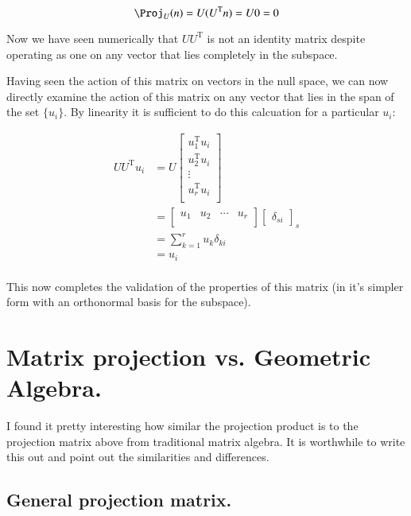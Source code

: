 \documentclass{article}      %
\newcommand{\T}[0]{{\text{T}}}
\begin{document}
\[
\Proj_U(n) = U (U^\T n) = U 0 = 0
\]

Now we have seen numerically that $U U^\T$ is not an identity matrix despite 
operating as one on any vector that lies completely in the subspace.

Having seen the action of this matrix on vectors in the null space, we can now
directly examine the action of this matrix on any vector that lies in the
span of the set $\{u_i\}$.  By linearity it is sufficient to do this calcuation 
for a particular $u_i$:

\begin{align*}
U U^\T u_i
&=
U
\begin{bmatrix}
u_1^\T u_i \\
u_2^\T u_i \\
\vdots \\
u_r^\T u_i \\
\end{bmatrix}
\\
&=
\begin{bmatrix}
{u_1} & {u_2} & \cdots & {u_r} \\
\end{bmatrix}
{
\begin{bmatrix}
\delta_{si}
\end{bmatrix}
}_s \\
&= \sum_{k=1}^{r} u_k \delta_{ki} \\
&= u_i \\
\end{align*}

This now completes the validation of the properties of this matrix (in it's simpler form with an orthonormal basis for the subspace).

\section{ Matrix projection vs. Geometric Algebra. }

I found it pretty interesting how similar the projection product is to the projection matrix above from traditional matrix algebra.  It is worthwhile
to write this out and point out the similarities and differences.

\subsection{ General projection matrix. }
\end{document}
